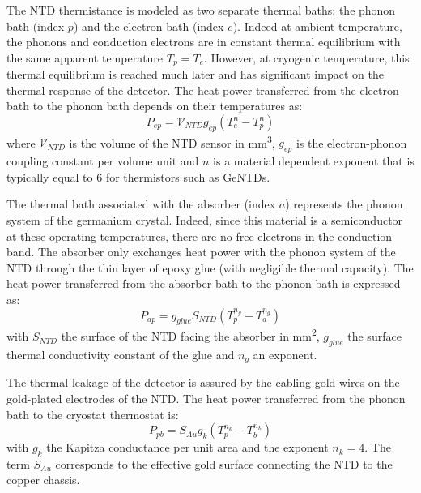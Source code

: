 The NTD thermistance is modeled as two separate thermal baths: the phonon bath (index $p$) and the electron bath (index $e$). Indeed at ambient temperature, the phonons and conduction electrons are in constant thermal equilibrium with the same apparent temperature $T_p = T_e$. However, at cryogenic temperature, this thermal equilibrium is reached much later and has significant impact on the thermal response of the detector. The heat power transferred from the electron bath to the phonon bath depends on their temperatures as:
\begin{equation}
\label{eq:ep-heat-power}
P_{ep}= \mathcal{V}_{NTD} g_{ep} (T_e^n - T_p^n)
\end{equation}
where $\mathcal{V}_{NTD}$ is the volume of the NTD sensor in \si{\mm^3}, $g_{ep}$ is the electron-phonon coupling constant per volume unit and $n$ is a material dependent exponent that is typically equal to 6 for thermistors such as GeNTDs.


The thermal bath associated with the absorber (index $a$) represents the phonon system of the germanium crystal. Indeed, since this material is a semiconductor at these operating temperatures, there are no free electrons in the conduction band. The absorber only exchanges heat power with the phonon system of the NTD through the thin layer of epoxy glue (with negligible thermal capacity). The heat power transferred from the absorber bath to the phonon bath is expressed as:
\begin{equation}
\label{eq:ap-heat-power}
P_{ap}=g_{glue} S_{NTD} \left( T_p^{n_g} - T_a^{n_g} \right)
\end{equation}
with $S_{NTD}$ the surface of the NTD facing the absorber in \si{\mm^2}, $g_{glue}$ the surface thermal conductivity constant of the glue and $n_g$ an exponent. 

The thermal leakage of the detector is assured by the cabling gold wires on the gold-plated electrodes of the NTD. The heat power transferred from the phonon bath to the cryostat thermostat is:
\begin{equation}
\label{eq:pb-heat-transfer}
P_{pb}= S_{Au} g_k (T_p^{n_k} - T_b^{n_k})
\end{equation}
with $g_k$ the Kapitza conductance per unit area and the exponent $n_k=4$. The term $S_{Au}$ corresponds to the effective gold surface connecting the NTD to the copper chassis.

